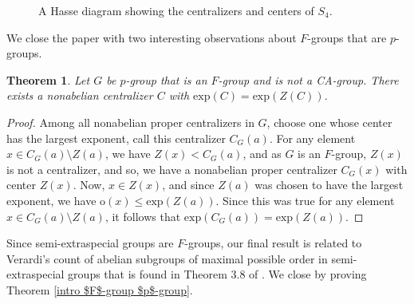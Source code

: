 \documentclass[12pt]{amsart}
\newtheorem{theorem}{Theorem}[section]
\begin{document}
{\begin{figure}[H]
	\centering
	\caption{A Hasse diagram showing the centralizers and centers of $S_4$.}
	\label{fig:fig1}
\end{figure}

We close the paper with two interesting observations about $F$-groups that are $p$-groups.

\begin{theorem}\label{thm:F-Gp-Exp}
Let $G$ be $p$-group that is an $F$-group and is not a CA-group.  There exists a nonabelian centralizer $C$ with $\mathrm{exp} (C) = \mathrm{exp} ({Z} (C))$. 
\end{theorem}

\begin{proof}
Among all nonabelian proper centralizers in $G$, choose one whose center has the largest exponent, call this centralizer ${C}_G(a)$.  For any element $x \in {C}_G(a) \setminus {Z}(a)$, we have ${Z}(x) < {C}_G(a)$, and as $G$ is an $F$-group, ${Z}(x)$ is not a centralizer, and so, we have a nonabelian proper centralizer ${C}_G(x)$ with center ${Z}(x)$.  Now, $x \in {Z}(x)$, and since ${Z}(a)$ was chosen to have the largest exponent, we have $\mathrm{o}(x) \leq \mathrm{exp}({Z}(a))$.  Since this was true for any element $x \in {C}_G(a) \setminus {Z}(a)$, it follows that $\mathrm{exp}({C}_G(a)) = \mathrm{exp}(Z(a))$. 
\end{proof}

Since semi-extraspecial groups are $F$-groups, our final result is related to Verardi's count of abelian subgroups of maximal possible order in semi-extraspecial groups that is found in Theorem 3.8 of \cite{verardi}.  We close by proving Theorem \ref{intro $F$-group $p$-group}.

}
\end{document}
